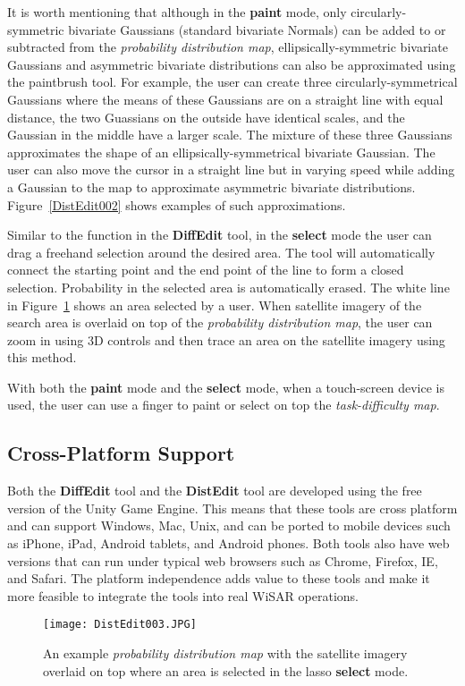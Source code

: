 It is worth mentioning that although in the \textbf{paint} mode, only circularly-symmetric bivariate Gaussians (standard bivariate Normals) can be added to or subtracted from the \textit{probability distribution map}, ellipsically-symmetric bivariate Gaussians and asymmetric bivariate distributions can also be approximated using the paintbrush tool. For example, the user can create three circularly-symmetrical Gaussians where the means of these Gaussians are on a straight line with equal distance, the two Guassians on the outside have identical scales, and the Gaussian in the middle have a larger scale. The mixture of these three Gaussians approximates the shape of an ellipsically-symmetrical bivariate Gaussian. The user can also move the cursor in a straight line but in varying speed while adding a Gaussian to the map to approximate asymmetric bivariate distributions. Figure~\ref{DistEdit002} shows examples of such approximations.

Similar to the function in the \textbf{DiffEdit} tool, in the \textbf{select} mode the user can drag a freehand selection around the desired area. The tool will automatically connect the starting point and the end point of the line to form a closed selection. Probability in the selected area is automatically erased. The white line in Figure~\ref{DistEdit003} shows an area selected by a user. When satellite imagery of the search area is overlaid on top of the \textit{probability distribution map}, the user can zoom in using 3D controls and then trace an area on the satellite imagery using this method.

With both the \textbf{paint} mode and the \textbf{select} mode, when a touch-screen device is used, the user can use a finger to paint or select on top the \textit{task-difficulty map}.

\subsection{Cross-Platform Support}

Both the \textbf{DiffEdit} tool and the \textbf{DistEdit} tool are developed using the free version of the Unity Game Engine. This means that these tools are cross platform and can support Windows, Mac, Unix, and can be ported to mobile devices such as iPhone, iPad, Android tablets, and Android phones. Both tools also have web versions that can run under typical web browsers such as Chrome, Firefox, IE, and Safari. The platform independence adds value to these tools and make it more feasible to integrate the tools into real WiSAR operations.

\begin{figure}
\centering
\texttt{[image: DistEdit003.JPG]}
\caption{An example \textit{probability distribution map} with the satellite imagery overlaid on top where an area is selected in the lasso \textbf{select} mode.}
\label{DistEdit003}
\end{figure}
